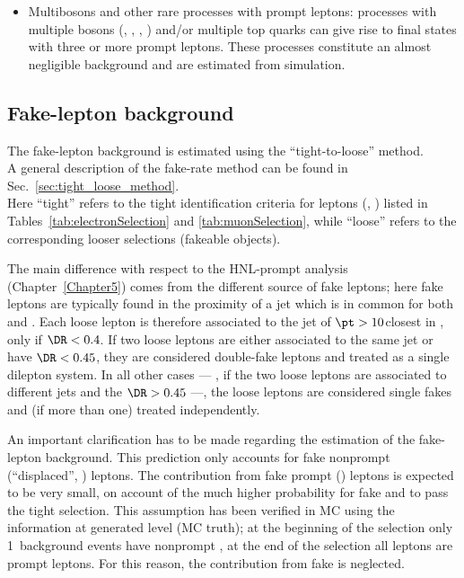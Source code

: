 \begin{itemize}
\item Multibosons and other rare processes with prompt
  leptons:
  processes with multiple bosons (\PW, \PZ, \PGg, \PH) and/or multiple
  top quarks can give rise to final states with three or more prompt
  leptons.
  These processes constitute an almost negligible background and are
  estimated from simulation.
\end{itemize}
 
\subsection{Fake-lepton background}\label{sec_llfakelepton}
The fake-lepton background is estimated using the ``tight-to-loose''
method.\\
A general description of the fake-rate method can be found in
Sec.~\ref{sec:tight_loose_method}.\\

Here ``tight'' refers to the tight identification criteria for
\displ leptons (\ltwo, \lthree) listed in
Tables~\ref{tab:electronSelection} and \ref{tab:muonSelection},
while  ``loose'' refers to the corresponding looser selections
(\ie fakeable objects).

The main difference with respect to the HNL-prompt analysis
(Chapter~\ref{Chapter5}) comes from the different source of fake
leptons; here fake leptons are typically found in the proximity of a
jet which is in common for both \ltwo and \lthree. Each loose
lepton is therefore associated to the jet of $\pt>10$\GeV closest in
\DR, only if $\DR<0.4$.
If two loose leptons 
are either associated to the same jet or have $\DR<0.45$, they are considered double-fake
leptons and treated as a single dilepton system.
In all other cases --- \ie, if the two loose leptons are associated to
different jets and the $\DR>0.45$ ---,
the loose leptons are considered single fakes and (if more than one)
treated independently.

An important clarification has to be made regarding the estimation of 
the fake-lepton background. This prediction only accounts for fake
nonprompt (``displaced'', \ltwothree) leptons. The contribution from
fake prompt (\ie \lone) leptons is expected to be very small, on
account of the much higher probability for fake \ltwo and \lthree to
pass the tight \displ selection. This assumption has been verified in
MC using the information at generated level (MC truth); at the
beginning of the selection only 1\textperthousand\ background
events have nonprompt \lone, at the end of the selection all \lone
leptons are prompt leptons. 
For this reason, the contribution from fake \lone is neglected.

